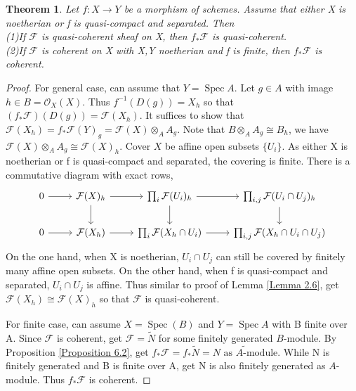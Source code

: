 \documentclass{ctexart}
\newtheorem{theorem}{Theorem}[section]
\newcommand{\spec}{\operatorname{Spec}}
\begin{document}
\begin{theorem}
    Let $f: X \longrightarrow Y$ be a morphism of schemes.
    Assume that either X is noetherian or f is quasi-compact and separated.
    Then \\
    (1)If $\mathcal{F}$ is quasi-coherent sheaf on X, then $f_{\ast}\mathcal{F}$ is quasi-coherent. \\
    (2)If $\mathcal{F}$ is coherent on X with X,Y noetherian and f is finite, then $f_{\ast}\mathcal{F}$ is coherent.
    \label{Theorem 6.2} 
\end{theorem}
\begin{proof}
    For general case, can assume that $Y = \spec A$.
    Let $g\in A$ with image $h\in B = \mathcal{O}_{X}(X)$.
    Thus $f^{-1}(D(g)) = X_{h}$ so that $(f_{\ast}\mathcal{F})(D(g)) = \mathcal{F}(X_{h})$.
    It suffices to show that $\mathcal{F}(X_{h}) = f_{\ast}\mathcal{F}(Y)_{g} = \mathcal{F}(X) \otimes_{A} A_{g}$.
    Note that $B \otimes_{A} A_{g} \cong B_{h}$, we have $\mathcal{F}(X) \otimes_{A} A_{g} \cong \mathcal{F}(X)_{h}$.
    Cover $X$ be affine open subsets $\{U_{i}\}$.
    As either X is noetherian or f is quasi-compact and separated, the covering is finite.
    There is a commutative diagram with exact rows,
    \begin{equation*}
        \begin{tikzcd}
            0 \arrow[r] &
            \mathcal{F}(X)_{h} \arrow[r] \arrow[d] &
            \prod_{i} \mathcal{F}(U_{i})_{h} \arrow[r] \arrow[d] &
            \prod_{i,j} \mathcal{F}(U_{i} \cap U_{j})_{h} \arrow[d] \\
            0 \arrow[r] &
            \mathcal{F}(X_{h}) \arrow[r] &
            \prod_{i} \mathcal{F}(X_{h} \cap U_{i}) \arrow[r] &
            \prod_{i,j} \mathcal{F}(X_{h} \cap U_{i} \cap U_{j})
        \end{tikzcd}
    \end{equation*}
    On the one hand, when X is noetherian, $U_{i} \cap U_{j}$ can still be covered by finitely many affine open subsets.
    On the other hand, when f is quasi-compact and separated, $U_{i} \cap U_{j}$ is affine.
    Thus similar to proof of Lemma \ref{Lemma 2.6}, get $\mathcal{F}(X_{h}) \cong \mathcal{F}(X)_{h}$ so that $\mathcal{F}$ is quasi-coherent.
    \par
    For finite case, can assume $X = \spec(B)$ and $Y = \spec A$ with B finite over A.
    Since $\mathcal{F}$ is coherent, get $\mathcal{F} = \widetilde{N}$ for some finitely generated $B$-module.
    By Proposition \ref{Proposition 6.2}, get $f_{\ast}\mathcal{F} = f_{\ast}\widetilde{N} = \widetilde{N \text{ as $A$-module}}$.
    While N is finitely generated and B is finite over A, get N is also finitely generated as $A$-module.
    Thus $f_{\ast}\mathcal{F}$ is coherent.
\end{proof}
\end{document}
